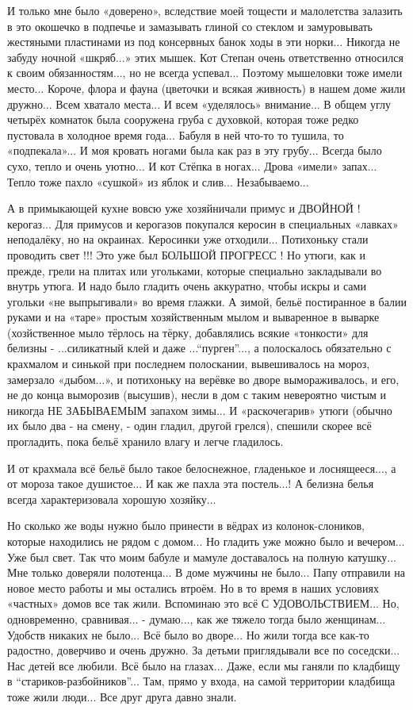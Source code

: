 И только мне было «доверено», вследствие моей тощести и малолетства залазить в
это окошечко в подпечье и замазывать глиной со стеклом и замуровывать жестяными
пластинами из под консервных банок ходы в эти норки... Никогда не забуду ночной
«шкряб...» этих мышек. Кот Степан очень ответственно относился к своим
обязанностям..., но не всегда успевал... Поэтому мышеловки тоже имели место...
Короче, флора и фауна (цветочки и всякая живность) в нашем доме жили дружно...
Всем хватало места... И всем «уделялось» внимание... В общем углу четырёх комнаток
была сооружена груба с духовкой, которая тоже редко пустовала в холодное время
года... Бабуля в ней что-то то тушила, то «подпекала»... И моя кровать ногами была
как раз в эту грубу... Всегда было сухо, тепло и очень уютно... И кот Стёпка в
ногах... Дрова «имели» запах... Тепло тоже пахло «сушкой» из яблок и слив...
Незабываемо...

А в примыкающей кухне вовсю уже хозяйничали примус и ДВОЙНОЙ ! керогаз... Для
примусов и керогазов покупался керосин в специальных «лавках» неподалёку, но на
окраинах. Керосинки уже отходили... Потихоньку стали проводить свет !!! Это уже
был БОЛЬШОЙ ПРОГРЕСС ! Но утюги, как и прежде, грели на плитах или угольками,
которые специально закладывали во внутрь утюга. И надо было гладить очень
аккуратно, чтобы искры и сами угольки «не выпрыгивали» во время глажки. А
зимой, бельё постиранное в балии руками и на «таре» простым хозяйственным мылом
и вываренное в выварке (хозйственное мыло тёрлось на тёрку, добавлялись всякие
«тонкости» для белизны - ...силикатный клей и даже ...\enquote{пурген}..., а полоскалось
обязательно с крахмалом и синькой при последнем полоскании, вывешивалось на
мороз, замерзало «дыбом...», и потихоньку на верёвке во дворе вымораживалось, и
его, не до конца выморозив (высушив), несли в дом с таким невероятно чистым и
никогда НЕ ЗАБЫВАЕМЫМ запахом зимы... И «раскочегарив» утюги (обычно их было два
- на смену, - один гладил, другой грелся), спешили скорее всё прогладить, пока
бельё хранило влагу и легче гладилось. 

И от крахмала всё бельё было такое белоснежное, гладенькое и лоснящееся..., а от
мороза такое душистое... И как же пахла эта постель...! А белизна белья всегда
характеризовала хорошую хозяйку...

Но сколько же воды нужно было принести в вёдрах из колонок-слоников, которые
находились не рядом с домом... Но гладить уже можно было и вечером... Уже был свет.
Так что моим бабуле и мамуле доставалось на полную катушку... Мне только доверяли
полотенца... В доме мужчины не было... Папу отправили на новое место работы и мы
остались втроём. Но в то время в наших условиях «частных» домов все так жили.
Вспоминаю это всё С УДОВОЛЬСТВИЕМ... Но, одновременно, сравнивая... - думаю..., как
же тяжело тогда было женщинам... Удобств никаких не было... Всё было во дворе...
Но жили тогда все как-то радостно, доверчиво и очень дружно. За детьми
приглядывали все по соседски... Нас детей все любили. Всё было на глазах... Даже,
если мы ганяли по кладбищу в \enquote{стариков-разбойников}... Там, прямо у входа, на
самой территории кладбища тоже жили люди... Все друг друга давно знали. 

